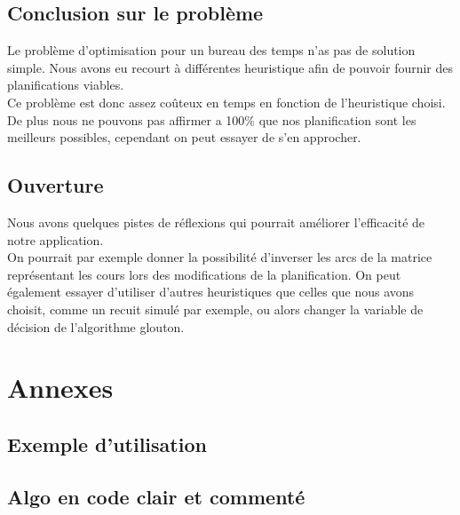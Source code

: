 \documentclass[a4paper,11pt]{article}
\begin{document}
	\subsection{Conclusion sur le problème}
	Le problème d'optimisation pour un bureau des temps n'as pas de solution simple. Nous avons eu recourt à différentes heuristique afin de pouvoir fournir des planifications viables.\\
	Ce problème est donc assez coûteux en temps en fonction de l'heuristique choisi. De plus nous ne pouvons pas affirmer a 100\% que nos planification sont les meilleurs possibles, cependant on peut essayer de s'en approcher.
	\subsection{Ouverture}
	Nous avons quelques pistes de réflexions qui pourrait améliorer l'efficacité de notre application.\\
	On pourrait par exemple donner la possibilité d'inverser les arcs de la matrice représentant les cours lors des modifications de la planification.
	On peut également essayer d'utiliser d'autres heuristiques que celles que nous avons choisit, comme un recuit simulé par exemple, ou alors changer la variable de décision de l'algorithme glouton.
\section{Annexes}
	\subsection{Exemple d'utilisation}
	\subsection{Algo en code clair et commenté}
\end{document}
